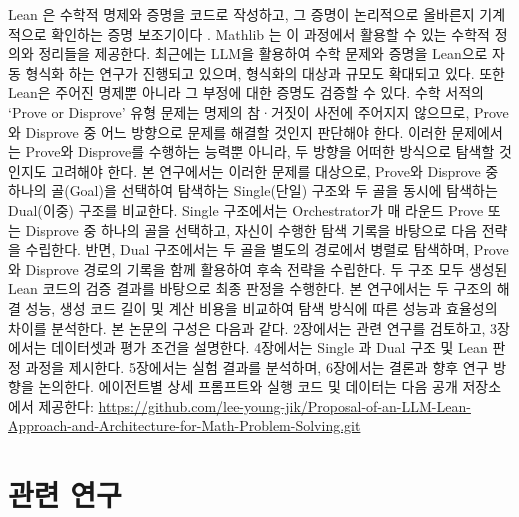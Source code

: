 \documentclass[a4paper,9pt,twocolumn]{extarticle}
\begin{document}
Lean 은 수학적 명제와 증명을 코드로 작성하고, 그 증명이 논리적으로 올바른지 기계적으로 확인하는 증명 보조기이다 \cite{r1}. Mathlib 는 이 과정에서 활용할 수 있는 수학적 정의와 정리들을 제공한다\cite{r2}. 최근에는 LLM을 활용하여 수학 문제와 증명을 Lean으로 자동 형식화 하는 연구가 진행되고 있으며, 형식화의 대상과 규모도 확대되고 있다\cite{r3,r4}. 또한 Lean은 주어진 명제뿐 아니라 그 부정에 대한 증명도 검증할 수 있다.
 수학 서적의 ‘Prove or Disprove’ 유형 문제는 명제의 참·거짓이 사전에 주어지지 않으므로, Prove와 Disprove 중 어느 방향으로 문제를 해결할 것인지 판단해야 한다. 이러한 문제에서는 Prove와 Disprove를 수행하는 능력뿐 아니라, 두 방향을 어떠한 방식으로 탐색할 것인지도 고려해야 한다. 본 연구에서는 이러한 문제를 대상으로, Prove와 Disprove 중 하나의 골(Goal)을 선택하여 탐색하는 Single(단일) 구조와 두 골을 동시에 탐색하는 Dual(이중) 구조를 비교한다. Single 구조에서는 Orchestrator가 매 라운드 Prove 또는 Disprove 중 하나의 골을 선택하고, 자신이 수행한 탐색 기록을 바탕으로 다음 전략을 수립한다. 반면, Dual 구조에서는 두 골을 별도의 경로에서 병렬로 탐색하며, Prove와 Disprove 경로의 기록을 함께 활용하여 후속 전략을 수립한다. 두 구조 모두 생성된 Lean 코드의 검증 결과를 바탕으로 최종 판정을 수행한다. 본 연구에서는 두 구조의 해결 성능, 생성 코드 길이 및 계산 비용을 비교하여 탐색 방식에 따른 성능과 효율성의 차이를 분석한다.
본 논문의 구성은 다음과 같다. 2장에서는 관련 연구를 검토하고, 3장에서는 데이터셋과 평가 조건을 설명한다. 4장에서는 Single 과 Dual 구조 및 Lean 판정 과정을 제시한다. 5장에서는 실험 결과를 분석하며, 6장에서는 결론과 향후 연구 방향을 논의한다. 에이전트별 상세 프롬프트와 실행 코드 및 데이터는 다음 공개 저장소에서 제공한다:
\url{https://github.com/lee-young-jik/Proposal-of-an-LLM-Lean-Approach-and-Architecture-for-Math-Problem-Solving.git}

\section{관련 연구}
\end{document}
